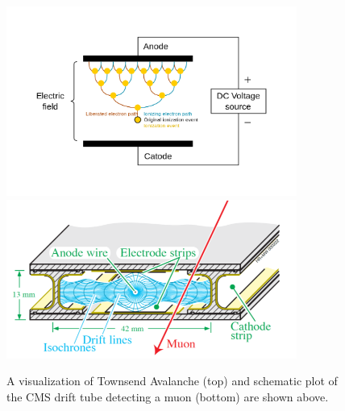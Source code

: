 \begin{figure}[hbtp]
\begin{center}
\includegraphics[width=0.85\textwidth]{Figures/Chapter2/EAva.png}
\includegraphics[width=0.85\textwidth]{Figures/Chapter2/CMSDT.png}
\caption{A visualization of Townsend Avalanche (top) and schematic plot of the CMS drift tube detecting a muon (bottom) are shown above.}
\label{Muonsystem}
\end{center}
\end{figure} 



